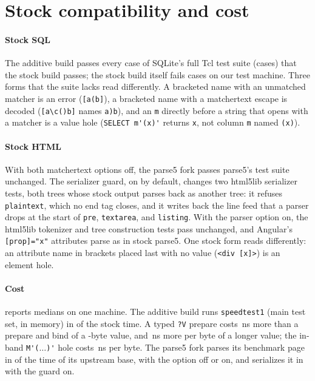 \section{Stock compatibility and cost}
\label{sec:appendix:systems}

\paragraph{Stock SQL}
The additive build passes every case of SQLite's full Tcl test suite
(\dataSqliteSuiteTests cases) that the stock build passes; the stock build
itself fails \dataSqliteSuiteStockErrors cases on our test machine. Three forms that
the suite lacks read differently. A bracketed name with an unmatched matcher is
an error (\verb|[a(b]|), a bracketed name with a matchertext escape is decoded
(\verb|[a\c()b]| names \verb|a)b|), and an \verb|m| directly before a string that
opens with a matcher is a value hole (\verb|SELECT m'(x)'| returns \texttt{x},
not column \texttt{m} named \texttt{(x)}).

\paragraph{Stock HTML}
With both matchertext options off, the parse5 fork passes parse5's test suite
unchanged. The serializer guard, on by default, changes two html5lib serializer
tests, both trees whose stock output parses back as another tree: it refuses
\texttt{plaintext}, which no end tag closes, and it writes back the line feed
that a parser drops at the start of \texttt{pre}, \texttt{textarea}, and
\texttt{listing}. With the parser option on, the html5lib tokenizer and tree
construction tests pass unchanged, and Angular's \verb|[prop]="x"| attributes
parse as in stock parse5. One stock form reads differently: an attribute name
in brackets placed last with no value (\verb|<div [x]>|) is an element hole.

\paragraph{Cost}
 reports medians on one machine. The additive build
runs \texttt{speedtest1} (main test set, in memory) in \dataPerfSpeedtestRatio of
the stock time. A typed \texttt{?V} prepare costs \dataPerfTypedShortExtraNs\,ns
more than a prepare and bind of a \dataPerfTypedShortLength-byte value, and
\dataPerfTypedNsPerByte\,ns more per byte of a longer value; the in-band
\verb|M'(|$\dots$\verb|)'| hole costs \dataPerfMtNsPerByte\,ns per byte. The
parse5 fork parses its benchmark page in \dataPerfParseRatio of the time of its
upstream base, with the option off or on, and serializes it in
\dataPerfSerializeRatio with the guard on.

